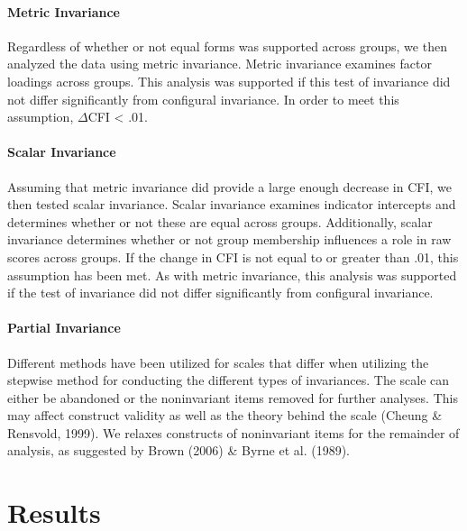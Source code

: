 \documentclass[man,draftall]{apa6}
\let\oldparagraph\paragraph
\renewcommand{\paragraph}[1]{\oldparagraph{#1}\mbox{}}
\begin{document}
\hypertarget{metric-invariance}{%
\paragraph{Metric Invariance}\label{metric-invariance}}

Regardless of whether or not equal forms was supported across groups, we then analyzed the data using metric invariance. Metric invariance examines factor loadings across groups. This analysis was supported if this test of invariance did not differ significantly from configural invariance. In order to meet this assumption, \(\Delta\)CFI \textless{} .01.

\hypertarget{scalar-invariance}{%
\paragraph{Scalar Invariance}\label{scalar-invariance}}

Assuming that metric invariance did provide a large enough decrease in CFI, we then tested scalar invariance. Scalar invariance examines indicator intercepts and determines whether or not these are equal across groups. Additionally, scalar invariance determines whether or not group membership influences a role in raw scores across groups. If the change in CFI is not equal to or greater than .01, this assumption has been met. As with metric invariance, this analysis was supported if the test of invariance did not differ significantly from configural invariance.

\hypertarget{partial-invariance}{%
\paragraph{Partial Invariance}\label{partial-invariance}}

Different methods have been utilized for scales that differ when utilizing the stepwise method for conducting the different types of invariances. The scale can either be abandoned or the noninvariant items removed for further analyses. This may affect construct validity as well as the theory behind the scale (Cheung \& Rensvold, 1999). We relaxes constructs of noninvariant items for the remainder of analysis, as suggested by Brown (2006) \& Byrne et al. (1989).

\hypertarget{results}{%
\section{Results}\label{results}}
\end{document}
